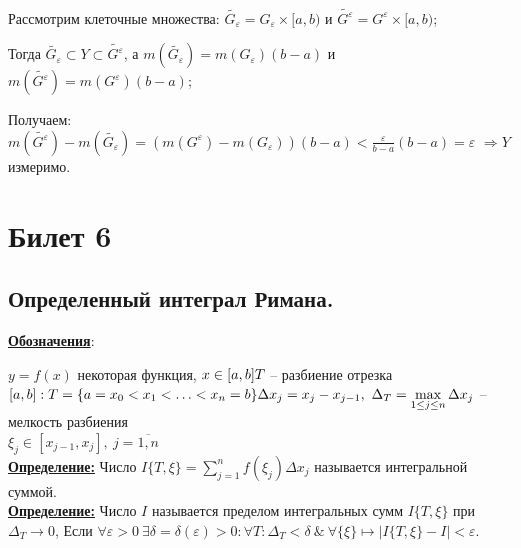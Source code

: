 \documentclass[a4paper,12pt]{article} %
\begin{document}
Рассмотрим клеточные множества: $\widetilde{G_{\varepsilon}} = G_{\varepsilon}\times [a, b)$ и $\widetilde{G^{\varepsilon}} = G^{\varepsilon}\times [a, b)$;

\vspace{2mm}

Тогда $\widetilde{G_{\varepsilon}} \subset Y \subset \widetilde{G^{\varepsilon}}$, а $m(\widetilde{G_{\varepsilon}}) = m(G_{\varepsilon})(b-a)$ и $m(\widetilde{G^{\varepsilon}}) = m(G^{\varepsilon})(b-a)$;

Получаем: $m(\widetilde{G^{\varepsilon}}) - m(\widetilde{G_{\varepsilon}}) = (m(G^{\varepsilon}) - m(G_{\varepsilon}))(b-a) < \frac{\varepsilon}{b-a}(b-a) = \varepsilon$ $\Rightarrow Y$ измеримо.



\newpage
\section{Билет 6}

\subsection{Определенный интеграл Римана.}
\underline{\textbf{Обозначения}}:

$y = f(x)$ некоторая функция, $x \in [a,b]\\T$ -- разбиение отрезка $[a,b]: T = \{a = x_0 < x_1 < {\dots} < x_n = b \}\\\Delta x_j = x_j - x_{j-1},~\Delta_T = \max\limits_{1\leq j\leq n}\Delta x_j$ -- мелкость разбиения\\ $\xi_j \in [x_{j-1},x_j],~j = \overline{1,n}$\\

\underline{\textbf{Определение:}} Число $I\{T,\xi\} =  \sum\limits_{j = 1}^{n} {f(\xi_j)\Delta x_j}$ называется интегральной суммой.\\

\underline{\textbf{Определение:}} Число $I$ называется пределом интегральных сумм $I\{T,\xi\}$ при $\Delta_T \longrightarrow 0$, Если $\forall\varepsilon>0~\exists\delta = \delta(\varepsilon)>0: \forall T:\Delta_{T}<\delta~\&~ \forall\{\xi\} \longmapsto|I\{T, \xi\}-I|<\varepsilon$.\\
\end{document}
